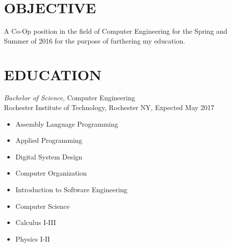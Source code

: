 \documentclass[line,margin]{res}
\begin{document}
\setlength\columnsep{-30pt}
\address{56 South Street Drury, MA}
\address{CRC3510@RIT.EDU}
\address{(413) 376-5034}

 
\begin{resume}
 \setlength\multicolsep{2pt}

\section{OBJECTIVE}   
	A Co-Op position in the field of Computer Engineering for the Spring and Summer of 2016 for the purpose of furthering my education.  
 
\section{EDUCATION} {\sl Bachelor of Science,} Computer Engineering \\
                Rochester Institute of Technology, Rochester NY, 
				Expected May 2017 %
				\begin{multicols}{2}
					\begin{itemize}
							\itemsep -2pt
						\item[] Assembly Language Programming
						\item[] Applied Programming
						\item[] Digital System Design
						\item[] Computer Organization
						\item[] Introduction to Software Engineering
						\item[] Computer Science
						\item[] Calculus I-III
						\item[] Physics I-II
					\end{itemize}
				\end{multicols}
 

\end{resume}
\end{document}
